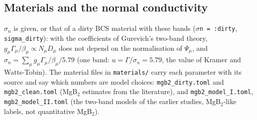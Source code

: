 \documentclass[11pt,a4paper]{article}
\newcommand{\code}[1]{\texttt{#1}}
\begin{document}
\subsection{Materials and the normal conductivity}

$\sigma_n$ is given, or that of a dirty BCS material with these bands (\code{\(\sigma\)n = :dirty}, \code{sigma\_dirty}):
with the coefficients of Gurevich's two-band theory, $g_\mu\Gamma_\mu/\beta_\mu \propto N_\mu D_\mu$ does not depend on the
normalisation of $\Psi_\mu$, and $\sigma_n = \sum_\mu g_\mu\Gamma_\mu/\beta_\mu / 5.79$ (one band: $u = \Gamma/\sigma_n =
5.79$, the value of Kramer and Watts-Tobin). The material files in \code{materials/} carry each parameter with its source
and say which numbers are model choices:
\code{mgb2\_dirty.toml} and \code{mgb2\_clean.toml} (MgB$_2$ estimates from the literature), and \code{mgb2\_model\_I.toml},
\code{mgb2\_model\_II.toml} (the two-band models of the earlier studies, MgB$_2$-like labels, not quantitative MgB$_2$).
\end{document}
